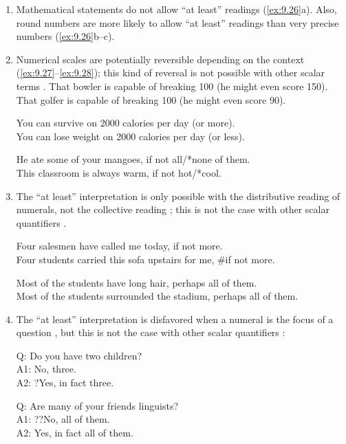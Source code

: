 \begin{enumerate}
\item Mathematical statements do not allow “at least” readings (\ref{ex:9.26}a). Also, round numbers are more likely to allow “at least” readings than very precise numbers (\ref{ex:9.26}b--c).

\ea \label{ex:9.26}
                       \z
\z
 
\item Numerical scales are potentially reversible depending on the context (\ref{ex:9.27}--\ref{ex:9.28}); this kind of reversal is not possible with other scalar terms .
\ea \label{ex:9.27}
\ea That bowler is capable of breaking 100 (he might even score 150).\\
\ex That golfer is capable of breaking 100 (he might even score 90).
                       \z
\z

\ea \label{ex:9.28}
\ea You can survive on 2000 calories per day (or more).\\
\ex You can lose weight on 2000 calories per day (or less).
                       \z
\z

\ea \label{ex:9.29}
\ea He ate some of your mangoes, if not all/*none of them.\\
\ex This classroom is always warm, if not hot/*cool.
                       \z
\z

\item The “at least” interpretation is only possible with the distributive reading of numerals, not the collective reading ; this is not the case with other scalar quantifiers .

\largerpage
\ea \label{ex:9.30}
\ea Four salesmen have called me today, if not more.\\
\ex Four students carried this sofa upstairs for me, \#if not more.
                       \z
\z

\ea \label{ex:9.31}
\ea Most of the students have long hair, perhaps all of them.\\
\ex Most of the students surrounded the stadium, perhaps all of them.
                       \z
\z

\item The “at least” interpretation is disfavored when a numeral is the focus of a question , but this is not the case with other scalar quantifiers :

\ea \label{ex:9.32}
Q: Do you have two children?\\
A1: No, three.\\
A2: ?Yes, in fact three.
\z

\ea \label{ex:9.33}
Q: Are many of your friends linguists?\\
A1: ??No, all of them.\\
A2: Yes, in fact all of them.
\z
\end{enumerate}



